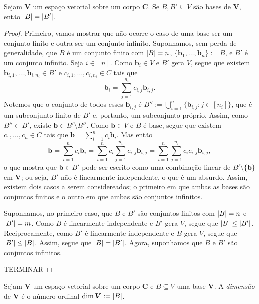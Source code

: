\begin{teo}
	Sejam $\bm V$ um espaço vetorial sobre um corpo $\bm C$. Se $B,B' \subseteq V$ são bases de $\bm V$, então $\left\vert{B}\right\vert = \left\vert{B'}\right\vert$.
\end{teo}
\begin{proof}
	Primeiro, vamos mostrar que não ocorre o caso de uma base ser um conjunto finito e outra ser um conjunto infinito. Suponhamos, sem perda de generalidade, que $B$ é um conjunto finito com $\left\vert{B}\right\vert=n$, $\{\bm b_1,\ldots,\bm b_n\} := B$, e $B'$ é um conjunto infinito. Seja $i \in [n]$. Como $\bm b_i \in V$ e $B'$ gera $V$, segue que existem $\bm b_{i,1}, \ldots, \bm b_{i,n_i} \in B'$ e $c_{i,1}, \ldots, c_{i,n_i} \in C$ tais que
	\begin{equation*}
	\bm b_i = \sum_{j=1}^{n_i} c_{i,j} \bm b_{i,j}.
	\end{equation*}
Notemos que o conjunto de todos esses $\bm b_{i,j}$ é $B'' := \bigcup_{i=1}^n \{\bm b_{i,j} : j \in [n_i]\}$, que é um subconjunto finito de $B'$ e, portanto, um subconjunto próprio. Assim, como $B'' \subset B'$, existe $\bm b \in B' \setminus B''$. Como $\bm b \in V$ e $B$ é base, segue que existem $c_1, \ldots, c_n \in C$ tais que $\bm b = \sum_{i=1}^n c_i \bm b_i$. Mas então
	\begin{equation*}
	\bm b = \sum_{i=1}^n c_i \bm b_i = \sum _{i=1}^n c_i \sum_{j=1}^{n_i} c_{i,j} \bm b_{i,j} = \sum _{i=1}^n \sum_{j=1}^{n_i} c_ic_{i,j} \bm b_{i,j},
	\end{equation*}
o que mostra que $\bm b \in B'$ pode ser escrito como uma combinação linear de $B' \setminus \{\bm b\}$ em $\bm V$; ou seja, $B'$ não é linearmente independente, o que é um absurdo. Assim, existem dois casos a serem considereados; o primeiro em que ambas as bases são conjuntos finitos e o outro em que ambas são conjuntos infinitos.

	Suponhamos, no primeiro caso, que $B$ e $B'$ são conjuntos finitos com $\left\vert{B}\right\vert=n$ e $\left\vert{B'}\right\vert=m$. Como $B$ é linearmente independente e $B'$ gera $V$, segue que $\left\vert{B}\right\vert \leq \left\vert{B'}\right\vert$. Reciprocamente, como $B'$ é linearmente independente e $B$ gera $V$, segue que $\left\vert{B'}\right\vert \leq \left\vert{B}\right\vert$. Assim, segue que $\left\vert{B}\right\vert = \left\vert{B'}\right\vert$. Agora, suponhamos que $B$ e $B'$ são conjuntos infinitos.

TERMINAR
\end{proof}

\begin{defi}
	Sejam $\bm V$ um espaço vetorial sobre um corpo $\bm C$ e $B \subseteq V$ uma base $\bm V$. A \emph{dimensão} de $\bm V$ é o número ordinal
	$\dim \bm V := \left\vert{B}\right\vert$.
\end{defi}

